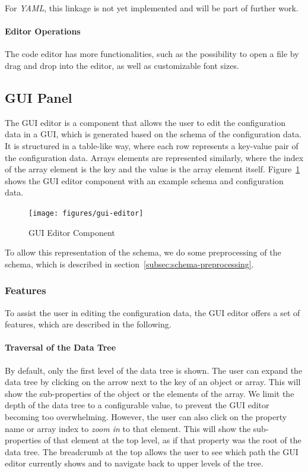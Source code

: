 For \textit{YAML}, this linkage is not yet implemented and will be part of further work.

\paragraph{Editor Operations}
The code editor has more functionalities, such as the possibility to open a file by drag and drop into the editor, as well as customizable font sizes.

\subsection{GUI Panel}\label{subsec:gui-editor}

The GUI editor is a component that allows the user to edit the configuration data in a GUI, which is generated based on the schema of the configuration data.
It is structured in a table-like way, where each row represents a key-value pair of the configuration data.
Arrays elements are represented similarly, where the index of the array element is the key and the value is the array element itself.
Figure~\ref{fig:gui-editor} shows the GUI editor component with an example schema and configuration data.

\begin{figure}[!t]
    \centering
    \texttt{[image: figures/gui-editor]} %
    \caption{GUI Editor Component}
    \label{fig:gui-editor}
\end{figure}

To allow this representation of the schema, we do some preprocessing of the schema, which is described in section~\ref{subsec:schema-preprocessing}.

\subsubsection{Features}\label{subsubsec:gui-editor-features}

To assist the user in editing the configuration data, the GUI editor offers a set of features, which are described in the following.

\paragraph{Traversal of the Data Tree}
By default, only the first level of the data tree is shown.
The user can expand the data tree by clicking on the arrow next to the key of an object or array.
This will show the sub-properties of the object or the elements of the array.
We limit the depth of the data tree to a configurable value, to prevent the GUI editor becoming too overwhelming.
However, the user can also click on the property name or array index to \textit{zoom in} to that element.
This will show the sub-properties of that element at the top level, as if that property was the root of the data tree.
The breadcrumb at the top allows the user to see which path the GUI editor currently shows and to navigate back to upper levels of the tree.


